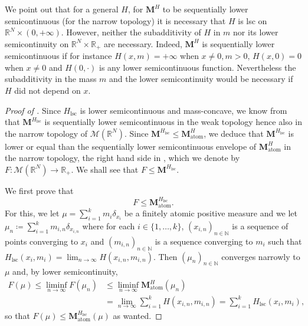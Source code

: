 \documentclass[10pt]{amsart}
\theoremstyle{plain}
\theoremstyle{definition}
\newcommand{\N}{\mathbb{N}}
\newcommand{\R}{\mathbb{R}}
\newcommand{\Mspace}{\mathscr{M}}
\newcommand{\mass}{\boldsymbol{M}}
\newcommand{\lsc}{\mathrm{lsc}}
\begin{document}
We point out that for a general $H$, for \(\mass^H\) to be sequentially lower semicontinuous (for the narrow topology) it is necessary that $H$ is lsc on $\R^N \times (0,+\infty)$. However, neither the subadditivity of \(H\) in $m$ nor its lower semicontinuity on $\R^N \times \R_+$ are necessary. Indeed, \(\mass^H\) is sequentially lower semicontinuous if for instance \(H(x,m)=+\infty\) when \(x\neq 0, m > 0\), \(H(x,0) = 0\) when $x\neq 0$ and \(H(0,\cdot)\) is any lower semicontinuous function. Nevertheless the subadditivity in the mass $m$ and the lower semicontinuity would be necessary if \(H\) did not depend on \(x\).

\begin{proof}[Proof of ]
Since \(H_\lsc\) is lower semicontinuous and mass-concave, we know from  that \(\mass^{H_\lsc}\) is sequentially lower semicontinuous in the weak topology hence also in the narrow topology of \(\Mspace(\R^N)\). Since \(\mass^{H_\lsc}\leq\mass_\mathrm{atom}^H\), we deduce that \(\mass^{H_\lsc}\) is lower or equal than the sequentially lower semicontinuous envelope of \(\mass_\mathrm{atom}^H\) in the narrow topology, \ie the right hand side in , which we denote by \(F:\Mspace(\R^N)\to\R_+\). We shall see that \(F\leq\mass^{H_\lsc}\).

We first prove that
\begin{equation}\label{FleqHlsc}
F\leq\mass_\mathrm{atom}^{H_\lsc}.
\end{equation}
For this, we let \(\mu=\sum_{i=1}^km_i\delta_{x_i}\) be a finitely atomic positive measure and we let \(\mu_n\coloneqq\sum_{i=1}^k m_{i,n}\delta_{x_{i,n}}\) where for each \(i\in\{1,\dots,k\}\), \((x_{i,n})_{n\in\N}\) is a sequence of points converging to \(x_i\) and \((m_{i,n})_{n\in\N}\) is a sequence converging to \(m_i\) such that \({H_\lsc}(x_i,m_i)=\lim_{n\to\infty}H(x_{i,n},m_{i,n})\). Then \((\mu_n)_{n\in\N}\) converges narrowly to \(\mu\) and, by lower semicontinuity,
\begin{align*}
F(\mu)\leq\liminf_{n\to\infty}F(\mu_n)&\leq\liminf_{n\to\infty}\mass_\mathrm{atom}^H(\mu_n)\\
&=\lim_{n\to\infty}\sum_{i=1}^k H(x_{i,n},m_{i,n})=\sum_{i=1}^k{H_\lsc}(x_i,m_i),
\end{align*}
so that \(F(\mu)\leq\mass_\mathrm{atom}^{H_\lsc}(\mu)\) as wanted.


\end{proof}
\end{document}

